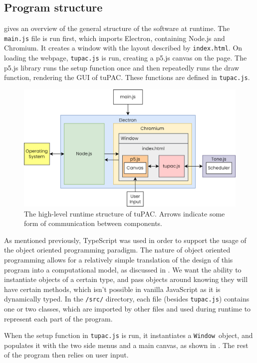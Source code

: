 \documentclass[12pt,a4paper,oneside,openright]{report}
\newcommand{\window}{\texttt{Window}}
\begin{document}
\subsection{Program structure}
 gives an overview of the general structure of the software at runtime. The \verb|main.js| file is run first, which imports Electron, containing Node.js and Chromium. It creates a window with the layout described by \verb|index.html|. On loading the webpage, \verb|tupac.js| is run, creating a p5.js canvas on the page. The p5.js library runs the setup function once and then repeatedly runs the draw function, rendering the GUI of tuPAC. These functions are defined in \verb|tupac.js|.

\begin{figure}[h]
    \centering
    \includegraphics[scale=0.35]{images/tuPAC_structure.png}
    \caption{The high-level runtime structure of tuPAC. Arrows indicate some form of communication between components.}
    \label{fig:tupac_structure}
\end{figure}

As mentioned previously, TypeScript was used in order to support the usage of the object oriented programming paradigm. The nature of object oriented programming allows for a relatively simple translation of the design of this program into a computational model, as discussed in . We want the ability to instantiate objects of a certain type, and pass objects around knowing they will have certain methods, which isn't possible in vanilla JavaScript as it is dynamically typed. In the \verb|/src/| directory, each file (besides \verb|tupac.js|) contains one or two classes, which are imported by other files and used during runtime to represent each part of the program.

When the setup function in \verb|tupac.js| is run, it instantiates a \window\ object, and populates it with the two side menus and a main canvas, as shown in . The rest of the program then relies on user input.
\end{document}
